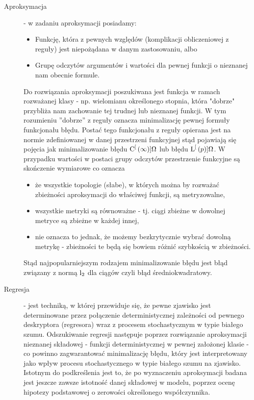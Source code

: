 \documentclass[10pt,a4paper]{book}
\begin{document}
\begin{description}
\item[Aproksymacja]  - w zadaniu aproksymacji posiadamy: 
\begin{itemize}
\item Funkcję, która z pewnych względów (komplikacji obliczeniowej z reguły) jest niepożądana w danym zastosowaniu, albo
\item Grupę odczytów argumentów i wartości dla pewnej funkcji o nieznanej nam obecnie formule.
\end{itemize}
Do rozwiązania aproksymacji poszukiwana jest funkcja w ramach rozważanej klasy - np. wielomianu określonego stopnia, która "dobrze" przybliża nam zachowanie tej trudnej lub nieznanej funkcji. W tym rozumieniu ''dobrze'' z reguły oznacza minimalizację pewnej formuły funkcjonału błędu. Postać tego funkcjonału z reguły opierana jest na normie zdefiniowanej w danej przestrzeni funkcyjnej stąd pojawiają się pojęcia jak minimalizowanie błędu $\Ck[\infty]{\Omega} $ lub błędu $\Lp[{p}]{\Omega}$. W przypadku wartości w postaci grupy odczytów przestrzenie funkcyjne są skończenie wymiarowe co oznacza
\begin{itemize}
\item że wszystkie topologie (słabe), w których można by rozważać zbieżności aproksymacji do właściwej funkcji, są metryzowalne,
\item wszystkie metryki są równoważne - tj. ciągi zbieżne w dowolnej metryce są zbieżne w każdej innej,
\item nie oznacza to jednak, że możemy bezkrytycznie wybrać dowolną metrykę - zbieżności te będą się bowiem różnić szybkością w zbieżności.
\end{itemize}
Stąd najpopularniejszym rodzajem minimalizowanie błędu jest błąd związany z normą $\operatorname{l}_{2}$ dla ciągów czyli błąd średniokwadratowy.
\item[Regresja] - jest techniką, w której przewiduje się, że pewne zjawisko jest determinowane przez połączenie deterministycznej zależności od pewnego deskryptora (regresora) wraz z procesem stochastycznym w typie białego szumu. Odszukiwanie regresji następuje poprzez rozwiązanie aproksymacji nieznanej składowej - funkcji deterministycznej w pewnej założonej klasie - co powinno zagwarantować minimalizację błędu, który jest interpretowany jako wpływ procesu stochastycznego w typie białego szumu na zjawisko. Istotnym do podkreślenia jest to, że po wyznaczeniu aproksymacji badana jest jeszcze zawsze istotność danej składowej w modelu, poprzez ocenę hipotezy podstawowej o zerowości określonego współczynnika.
\end{description}
\end{document}
